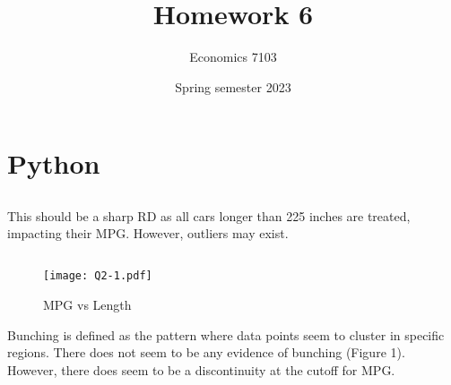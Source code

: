 \documentclass{article}
\title{Homework 6}
\author{Economics 7103}
\date{Spring semester 2023}
\begin{document}
\maketitle
\section{Python}
\subsection{}
This should be a sharp RD as all cars longer than 225 inches are treated, impacting their MPG. However, outliers may exist. 
\newline

\subsection{}
\begin{figure}[ht]
    \centering
    \texttt{[image: Q2-1.pdf]}
    \caption{MPG vs Length}
    \label{fig:my_label}
\end{figure}

Bunching is defined as the pattern where data points seem to cluster in specific regions. There does not seem to be any evidence of bunching (Figure 1). However, there does seem to be a discontinuity at the cutoff for MPG.   
\newline

\subsection{}
\end{document}

